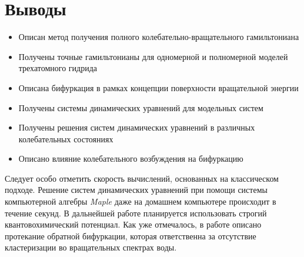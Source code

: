 \section{Выводы}

\begin{itemize}
\item Описан метод получения полного колебательно-вращательного гамильтониана
\item Получены точные гамильтонианы для одномерной и полномерной моделей трехатомного гидрида
\item Описана бифуркация в рамках концепции поверхности вращательной энергии
\item Получены системы динамических уравнений для модельных систем
\item Получены решения систем динамических уравнений в различных колебательных состояниях 
\item Описано влияние колебательного возбуждения на бифуркацию
\end{itemize}

Следует особо отметить скорость вычислений, основанных на классическом подходе. Решение систем динамических уравнений при помощи системы компьютерной алгебры \textit{Maple} даже на домашнем компьютере происходит в течение секунд.
В дальнейшей работе планируется использовать строгий квантовохимический потенциал. Как уже отмечалось, в работе \cite{petrov2002} описано протекание обратной бифуркации, которая ответственна за отсутствие кластеризации во вращательных спектрах воды.  

